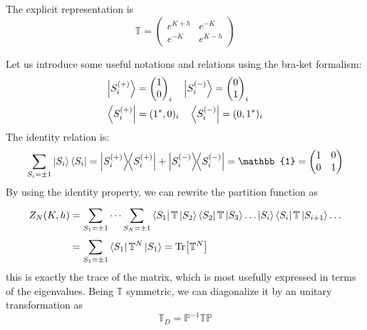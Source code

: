 \documentclass[../main/main.tex]{subfiles}
\begin{document}
The explicit representation is
\begin{equation}
  \mathbb{T} =
\begin{pmatrix}
e^{K+h}    & e^{-K}  \\
  e^{-K}  & e^{K-h}
\end{pmatrix}
\end{equation}

Let us introduce some useful notations and relations using the bra-ket formalism:
\begin{subequations}
\begin{align}
  \ket{S_i^{(+)}} &= \begin{pmatrix}
  1 \\
  0
  \end{pmatrix}_i
  \quad
  \ket{S_i^{(-)}} = \begin{pmatrix}
  0 \\
  1
  \end{pmatrix}_i   \\
  \bra{S_i^{(+)}} &= (1^*,0)_i \quad   \bra{S_i^{(-)}} = (0,1^*)_i
\end{align}
\end{subequations}
The identity relation is:
\begin{equation}
  \sum_{S_i = \pm 1}^{}  \ket{S_i} \bra{S_i} =
  \ketbra{S_i^{(+)}}{S_i^{(+)}} + \ketbra{S_i^{(-)}}{S_i^{(-)}}
  =\mathbb{1} = \begin{pmatrix}
  1   & 0 \\
  0   & 1
  \end{pmatrix}
\end{equation}
By using the identity property, we can rewrite the partition function as 
\begin{equation}
  \begin{split}
   Z_N (K,h) &= \sum_{S_1 = \pm 1}^{} \dots \sum_{S_N = \pm 1}^{} \bra{S_1} \mathbb{T} \ket{S_2} \bra{S_2}  \mathbb{T} \ket{S_3} \dots \ket{S_i} \bra{S_i}  \mathbb{T} \ket{S_{i+1}} \dots \\
   & = \sum_{S_1 = \pm 1}^{}  \bra{S_1}  \mathbb{T}^N \ket{S_1} = \Tr[\mathbb{T}^N]
     \end{split}
\end{equation}
this is exactly the trace of the matrix, which is most usefully expressed in terms of the eigenvalues. Being \( \mathbb{T} \) symmetric, we can diagonalize it by an unitary transformation as
\begin{equation}
   \mathbb{T}_D = \mathbb{P}^{-1} \mathbb{T} \mathbb{P}
\end{equation}
\end{document}
